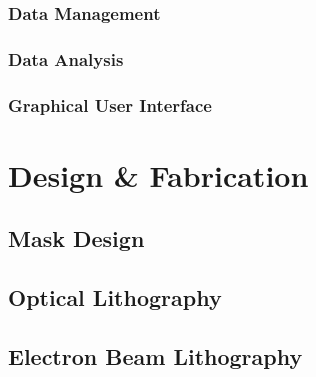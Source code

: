 \documentclass{scrbook}
\begin{document}
\subsection{Data Management}

\subsection{Data Analysis}

\subsection{Graphical User Interface}

\chapter{Design \& Fabrication}

\section{Mask Design}

\section{Optical Lithography}

\section{Electron Beam Lithography}

\cite{Dewes:arXiv0809.1346}






\end{document}
